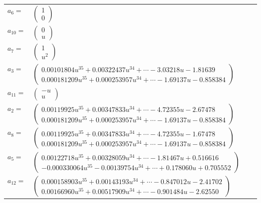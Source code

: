 \documentclass[1p]{elsarticle_modified}
\theoremstyle{definition}
\begin{document}
\begin{tabular}{m{7pt} m{180pt} m{7pt} m{180pt} }
\flushright $a_{6}=$&$\begin{pmatrix}1\\0\end{pmatrix}$ \\
\flushright $a_{10}=$&$\begin{pmatrix}0\\u\end{pmatrix}$ \\
\flushright $a_{7}=$&$\begin{pmatrix}1\\u^2\end{pmatrix}$ \\
\flushright $a_{3}=$&$\begin{pmatrix}0.00101804 u^{35}+0.00322437 u^{34}+\cdots-3.03218 u-1.81639\\0.000181209 u^{35}+0.000253957 u^{34}+\cdots-1.69137 u-0.858384\end{pmatrix}$ \\
\flushright $a_{11}=$&$\begin{pmatrix}- u\\u\end{pmatrix}$ \\
\flushright $a_{2}=$&$\begin{pmatrix}0.00119925 u^{35}+0.00347833 u^{34}+\cdots-4.72355 u-2.67478\\0.000181209 u^{35}+0.000253957 u^{34}+\cdots-1.69137 u-0.858384\end{pmatrix}$ \\
\flushright $a_{8}=$&$\begin{pmatrix}0.00119925 u^{35}+0.00347833 u^{34}+\cdots-4.72355 u-1.67478\\0.000181209 u^{35}+0.000253957 u^{34}+\cdots-1.69137 u-0.858384\end{pmatrix}$ \\
\flushright $a_{5}=$&$\begin{pmatrix}0.00122718 u^{35}+0.00328059 u^{34}+\cdots-1.81467 u+0.516616\\-0.000330064 u^{35}-0.00139754 u^{34}+\cdots+0.178060 u+0.705552\end{pmatrix}$ \\
\flushright $a_{12}=$&$\begin{pmatrix}0.000158903 u^{35}+0.00143193 u^{34}+\cdots-0.847012 u-2.41702\\0.00166960 u^{35}+0.00517909 u^{34}+\cdots-0.901484 u-2.62550\end{pmatrix}$ \\

\end{tabular}
\end{document}
